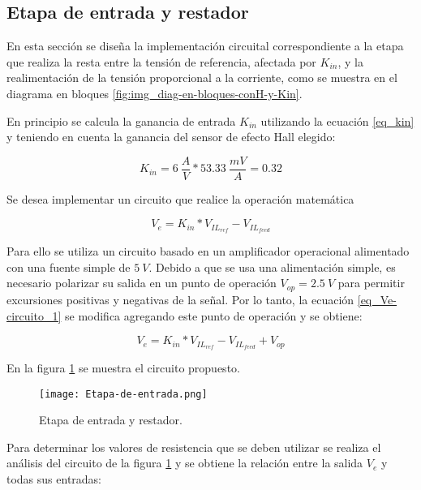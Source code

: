 \subsection{Etapa de entrada y restador}

En esta sección se diseña la implementación circuital correspondiente a la etapa que realiza la resta entre la tensión de referencia, afectada por $K_{in}$, y la realimentación de la tensión proporcional a la corriente, como se muestra en el diagrama en bloques \ref{fig:img_diag-en-bloques-conH-y-Kin}.



En principio se calcula la ganancia de entrada $K_{in}$ utilizando la ecuación \ref{eq_kin} y teniendo en cuenta la ganancia del sensor de efecto Hall elegido:

\begin{equation}
	K_{in}=6\:\frac{A}{V}*53.33\:\frac{mV}{A}=0.32
\end{equation}

Se desea implementar un circuito que realice la operación matemática 

\begin{equation}\label{eq_Ve-circuito_1}
	V_e=K_{in}*V_{IL_{ref}} - V_{IL_{feed}}
\end{equation}

Para ello se utiliza un circuito basado en un amplificador operacional alimentado con una fuente simple de $5\:V$. Debido a que se usa una alimentación simple, es necesario polarizar su salida en un punto de operación $V_{op}=2.5\:V$ para permitir excursiones positivas y negativas de la señal. Por lo tanto, la ecuación \ref{eq_Ve-circuito_1} se modifica agregando este punto de operación y se obtiene:

\begin{equation}\label{eq_Ve-circuito}
V_e=K_{in}*V_{IL_{ref}} - V_{IL_{feed}} + V_{op}
\end{equation}

En la figura \ref{fig:img_etapa-de-entrada} se muestra el circuito propuesto. 


\begin{figure}[H]
	\centering
	\texttt{[image: Etapa-de-entrada.png]}
	\caption{Etapa de entrada y restador.}
	\label{fig:img_etapa-de-entrada}
\end{figure}

Para determinar los valores de resistencia que se deben utilizar se realiza el análisis del circuito de la figura \ref{fig:img_etapa-de-entrada} y se obtiene la relación entre la salida $V_e$ y todas sus entradas:

